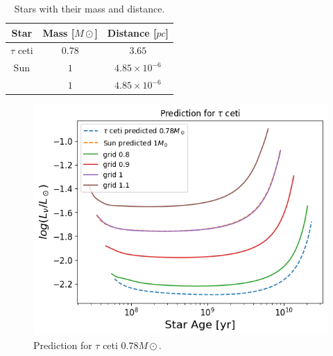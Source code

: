 \begin{table}[H]
    \centering
	\caption{Stars with their mass and distance.}
	\label{tab:stars and mass}
	\begin{tabular}{ccc}
		\toprule
		Star & Mass [$M\odot$]  & Distance [$pc$] \\
		\midrule
		$\tau$ ceti & $0.78$ & $3.65$\\
		Sun & $1$ & $4.85\times 10^{-6}$\\
		 & $1$ & $4.85\times 10^{-6}$\\
		\bottomrule
	\end{tabular}
\end{table}

\begin{figure}[H]
	\centering
	\includegraphics[width=\textwidth,height=0.5\textheight]{assets/predtauceti.png}
	\caption{Prediction for $\tau$ ceti $0.78 M\odot$.}
	\label{fig:tau}
\end{figure}


